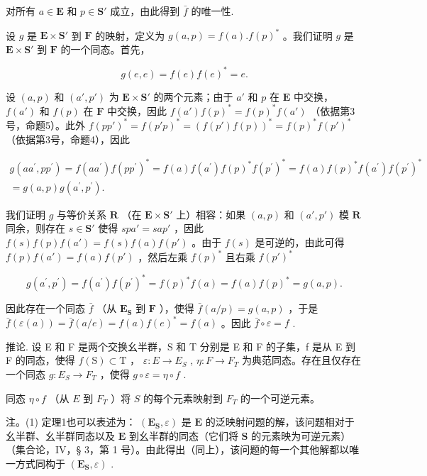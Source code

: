 对所有 \(a \in \mathbf{E}\) 和 \(p \in \mathbf{S}'\) 成立，由此得到 \(\bar{f}\) 的唯一性.

设 \(g\) 是 \(\mathbf{E} \times \mathbf{S}'\) 到 \(\mathbf{F}\) 的映射，定义为 \(g(a, p) = f(a).f(p)^*\) 。我们证明 \(g\) 是 \(\mathbf{E} \times \mathbf{S}'\) 到 \(\mathbf{F}\) 的一个同态。首先，

\[
g (e, e) = f (e) f (e) ^ {*} = e.
\]

设 \((a, p)\) 和 \((a', p')\) 为 \(\mathbf{E} \times \mathbf{S}'\) 的两个元素；由于 \(a'\) 和 \(p\) 在 \(\mathbf{E}\) 中交换， \(f(a')\) 和 \(f(p)\) 在 \(\mathbf{F}\) 中交换，因此 \(f(a')f(p)^* = f(p)^*f(a')\) （依据第3号，命题5）。此外 \(f(p p')^* = f(p' p)^* = (f(p')f(p))^* = f(p)^*f(p')^*\) （依据第3号，命题4），因此

\[
\begin{array}{l} g (a a ^ {\prime}, p p ^ {\prime}) = f (a a ^ {\prime}) f (p p ^ {\prime}) ^ {*} = f (a) f (a ^ {\prime}) f (p) ^ {*} f (p ^ {\prime}) ^ {*} = f (a) f (p) ^ {*} f (a ^ {\prime}) f (p ^ {\prime}) ^ {*} \\ = g (a, p) g (a ^ {\prime}, p ^ {\prime}). \end{array}
\]

我们证明 \(g\) 与等价关系 \(\mathbf{R}\) （在 \(\mathbf{E} \times \mathbf{S}'\) 上）相容：如果 \((a, p)\) 和 \((a', p')\) 模 \(\mathbf{R}\) 同余，则存在 \(s \in \mathbf{S}'\) 使得 \(spa' = sap'\) ，因此 \(f(s)f(p)f(a') = f(s)f(a)f(p')\) 。由于 \(f(s)\) 是可逆的，由此可得 \(f(p)f(a') = f(a)f(p')\) ，然后左乘 \(f(p)^*\) 且右乘 \(f(p')^*\)

\[
g (a ^ {\prime}, p ^ {\prime}) = f (a ^ {\prime}) f (p ^ {\prime}) ^ {*} = f (p) ^ {*} f (a) = f (a) f (p) ^ {*} = g (a, p).
\]

因此存在一个同态 \(\bar{f}\) （从 \(\mathbf{E}_{\mathbf{S}}\) 到 \(\mathbf{F}\) ），使得 \(\bar{f}(a/p) = g(a,p)\) ，于是 \(\bar{f}(\varepsilon(a)) = \bar{f}(a/e) = f(a)f(e)^* = f(a)\) 。因此 \(\bar{f} \circ \varepsilon = f\) .

推论. 设 E 和 F 是两个交换幺半群，S 和 T 分别是 E 和 F 的子集，f 是从 E 到 F 的同态，使得 \(f(\mathrm{S}) \subset \mathrm{T}\) ， \(\varepsilon: E \to E_{S}\) , \(\eta: F \to F_{T}\) 为典范同态。存在且仅存在一个同态 \(g: E_{S} \to F_{T}\) ，使得 \(g \circ \varepsilon = \eta \circ f\) .

同态 \(\eta \circ f\) （从 \(E\) 到 \(F_{T}\) ）将 \(S\) 的每个元素映射到 \(F_{T}\) 的一个可逆元素。

注。(1) 定理1也可以表述为： \((\mathbf{E}_{\mathbf{S}},\varepsilon)\) 是 \(\mathbf{E}\) 的泛映射问题的解，该问题相对于幺半群、幺半群同态以及 \(\mathbf{E}\) 到幺半群的同态（它们将 \(\mathbf{S}\) 的元素映为可逆元素）（集合论，IV，§ 3，第 1 号）。由此得出（同上），该问题的每一个其他解都以唯一方式同构于 \((\mathbf{E}_{\mathbf{S}},\varepsilon)\) .

